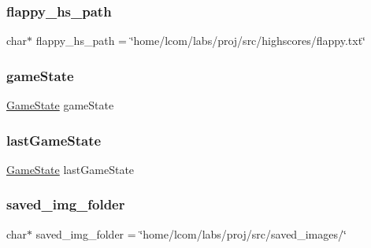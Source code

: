 \mbox{\label{group__proj_ga226ced26c9ad1f22a223e7c25888e253}} 
\subsubsection{\texorpdfstring{flappy\+\_\+hs\+\_\+path}{flappy\_hs\_path}}
{\footnotesize\ttfamily char$\ast$ flappy\+\_\+hs\+\_\+path = \char`\"{}home/lcom/labs/proj/src/highscores/flappy.\+txt\char`\"{}\hspace{0.3cm}{\ttfamily [static]}}

\mbox{\label{group__proj_ga2706ed05d331ef3b53c728a6868bda26}} 
\subsubsection{\texorpdfstring{game\+State}{gameState}}
{\footnotesize\ttfamily \mbox{\hyperlink{group__game__state_ga7899b65f1ea0f655e4bbf8d2a5714285}{Game\+State}} game\+State}

\mbox{\label{group__proj_ga52324cba31cbe30e5a1c1fa55962a9a6}} 
\subsubsection{\texorpdfstring{last\+Game\+State}{lastGameState}}
{\footnotesize\ttfamily \mbox{\hyperlink{group__game__state_ga7899b65f1ea0f655e4bbf8d2a5714285}{Game\+State}} last\+Game\+State}

\mbox{\label{group__proj_ga0bd738406244c9e2cfb7a40534063a8d}} 
\subsubsection{\texorpdfstring{saved\+\_\+img\+\_\+folder}{saved\_img\_folder}}
{\footnotesize\ttfamily char$\ast$ saved\+\_\+img\+\_\+folder = \char`\"{}home/lcom/labs/proj/src/saved\+\_\+images/\char`\"{}\hspace{0.3cm}{\ttfamily [static]}}

